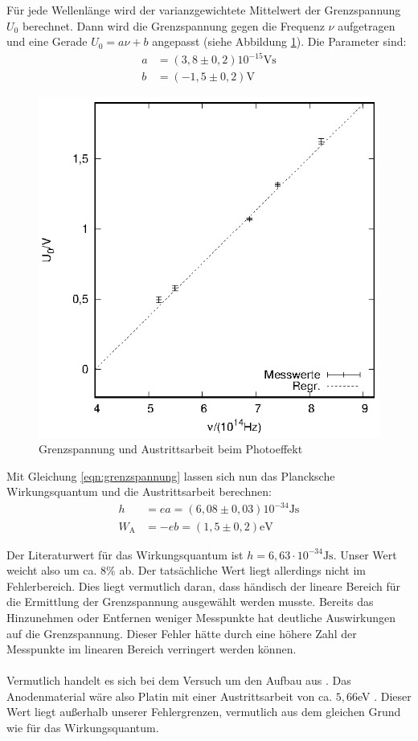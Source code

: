 \vfill
\clearpage

Für jede Wellenlänge wird der varianzgewichtete Mittelwert der Grenzspannung $U_0$ berechnet. Dann wird die Grenzspannung gegen die Frequenz $\nu$ aufgetragen und eine Gerade $U_0=a\nu+b$ angepasst (siehe Abbildung \ref{planck}). Die Parameter sind: 
\begin{align*}
  a&=(3,8 \pm 0,2)10^{-15}\mathrm{Vs}\\  
  b&=(-1,5 \pm 0,2) \mathrm{V}
\end{align*}

\begin{figure}[h]
  \centering
  \includegraphics[width=0.75\linewidth]{data/Messung_photoeffekt/f_u.eps}
  \caption{Grenzspannung und Austrittsarbeit beim Photoeffekt}
  \label{planck}
\end{figure}


Mit Gleichung \ref{eqn:grenzspannung} lassen sich nun das Plancksche Wirkungsquantum und die Austrittsarbeit berechnen:
\begin{align*}
  h&=ea=(6,08 \pm 0,03)10^{-34}\mathrm{Js}\\
  W_\mathrm{A}&=-eb=(1,5 \pm 0,2)\mathrm{eV}
\end{align*}

Der Literaturwert für das Wirkungsquantum ist $h=6,63 \cdot 10^{-34}\mathrm{Js}$. Unser Wert weicht also um ca. $8\%$ ab. Der tatsächliche Wert liegt allerdings nicht im Fehlerbereich. Dies liegt vermutlich daran, dass händisch der lineare Bereich für die Ermittlung der Grenzspannung ausgewählt werden musste. Bereits das Hinzunehmen oder Entfernen weniger Messpunkte hat deutliche Auswirkungen auf die Grenzspannung. Dieser Fehler hätte durch eine höhere Zahl der Messpunkte im linearen Bereich verringert werden können. \\ \\
Vermutlich handelt es sich bei dem Versuch um den Aufbau aus \cite{leybold}. Das Anodenmaterial wäre also Platin mit einer Austrittsarbeit von ca. $5,66$eV \cite{kalium}. Dieser Wert liegt außerhalb unserer Fehlergrenzen, vermutlich aus dem gleichen Grund wie für das Wirkungsquantum. \\ \\

